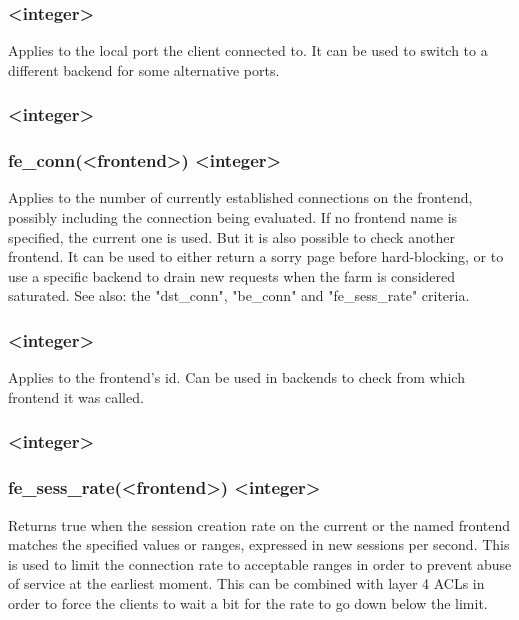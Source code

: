 \subsubsection[dst\_port]{ <integer>}
  Applies to the local port the client connected to. It can be used to switch
  to a different backend for some alternative ports.

\subsubsection[fe_conn]{ <integer>}
\subsubsection*{fe\_conn(<frontend>) <integer>}
  Applies to the number of currently established connections on the frontend,
  possibly including the connection being evaluated. If no frontend name is
  specified, the current one is used. But it is also possible to check another
  frontend. It can be used to either return a sorry page before hard-blocking,
  or to use a specific backend to drain new requests when the farm is
  considered saturated. See also: the "dst\_conn", "be\_conn" and "fe\_sess\_rate"
  criteria.

\subsubsection[fe\_id]{ <integer>}
  Applies to the frontend's id. Can be used in backends to check from which
  frontend it was called.

\subsubsection[fe\_sess\_rate]{ <integer>}
\subsubsection*{fe\_sess\_rate(<frontend>) <integer>}
  Returns true when the session creation rate on the current or the named
  frontend matches the specified values or ranges, expressed in new sessions
  per second. This is used to limit the connection rate to acceptable ranges in
  order to prevent abuse of service at the earliest moment. This can be
  combined with layer 4 ACLs in order to force the clients to wait a bit for
  the rate to go down below the limit.

